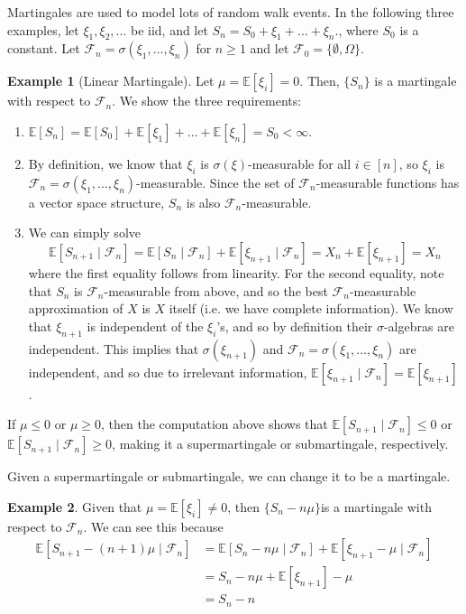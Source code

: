 \documentclass{article}
\theoremstyle{definition}
\newtheorem{example}{Example}[section]
\theoremstyle{remark}
\theoremstyle{definition}
\begin{document}
Martingales are used to model lots of random walk events. In the following three examples, let $\xi_1, \xi_2, \ldots$ be iid, and let $S_n = S_0 + \xi_1 + \ldots + \xi_n$., where $S_0$ is a constant. Let $\mathcal{F}_n = \sigma(\xi_1, \ldots, \xi_n)$ for $n \geq 1$ and let $\mathcal{F}_0 = \{\emptyset, \Omega\}$. 

\begin{example}[Linear Martingale]
Let $\mu = \mathbb{E}[\xi_i] = 0$. Then, $\{S_n\}$ is a martingale with respect to $\mathcal{F}_n$. We show the three requirements: 
\begin{enumerate}
    \item $\mathbb{E}[S_n] = \mathbb{E}[S_0] + \mathbb{E}[\xi_1] + \ldots + \mathbb{E}[\xi_n] = S_0 < \infty$. 
    
    \item By definition, we know that $\xi_i$ is $\sigma(\xi)$-measurable for all $i \in [n]$, so $\xi_i$ is $\mathcal{F}_n = \sigma(\xi_1, \ldots, \xi_n)$-measurable. Since the set of $\mathcal{F}_n$-measurable functions has a vector space structure, $S_n$ is also $\mathcal{F}_n$-measurable. 
    
    \item We can simply solve 
    \[\mathbb{E}[S_{n+1} \mid \mathcal{F}_n] = \mathbb{E}[S_n \mid \mathcal{F}_n] + \mathbb{E}[\xi_{n+1} \mid \mathcal{F}_n] = X_n + \mathbb{E}[\xi_{n+1}] = X_n\]
    where the first equality follows from linearity. For the second equality, note that $S_n$ is $\mathcal{F}_n$-measurable from above, and so the best $\mathcal{F}_n$-measurable approximation of $X$ is $X$ itself (i.e. we have complete information). We know that $\xi_{n+1}$ is independent of the $\xi_i$'s, and so by definition their $\sigma$-algebras are independent. This implies that $\sigma(\xi_{n+1})$ and $\mathcal{F}_n = \sigma(\xi_1, \ldots, \xi_n)$ are independent, and so due to irrelevant information, $\mathbb{E}[\xi_{n+1} \mid \mathcal{F}_n] = \mathbb{E}[\xi_{n+1}]$. 
\end{enumerate}
If $\mu \leq 0$ or $\mu \geq 0$, then the computation above shows that $\mathbb{E}[S_{n+1} \mid \mathcal{F}_n] \leq 0$ or $\mathbb{E}[S_{n+1} \mid \mathcal{F}_n] \geq 0$, making it a supermartingale or submartingale, respectively. 
\end{example}

Given a supermartingale or submartingale, we can change it to be a martingale. 

\begin{example}
Given that $\mu = \mathbb{E}[\xi_i] \neq 0$, then $\{S_n - n\mu\}$is a martingale with respect to $\mathcal{F}_n$. We can see this because
\begin{align*}
    \mathbb{E}[S_{n+1} - (n + 1)\mu \mid \mathcal{F}_n] & = \mathbb{E}[S_n - n \mu \mid \mathcal{F}_n] + \mathbb{E}[\xi_{n+1} - \mu \mid \mathcal{F}_n] \\
    & = S_n - n \mu + \mathbb{E}[\xi_{n+1}] - \mu \\
    & = S_n - n
\end{align*}
\end{example}
\end{document}
